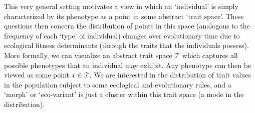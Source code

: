 This very general setting motivates a view in which an `individual' is simply characterized by its phenotype as a point in some abstract `trait space'. These questions then concern the distribution of points in this space (analogous to the frequency of each `type' of individual) changes over evolutionary time due to ecological fitness determinants (through the traits that the individuals possess). More formally, we can visualize an abstract trait space $\mathcal{T}$ which captures all possible phenotypes that an individual may exhibit. Any phenotype can then be viewed as some point $x \in \mathcal{T}$. We are interested in the distribution of trait values in the population subject to some ecological and evolutionary rules, and a `morph' or `eco-variant' is just a cluster within this trait space (a mode in the distribution).




